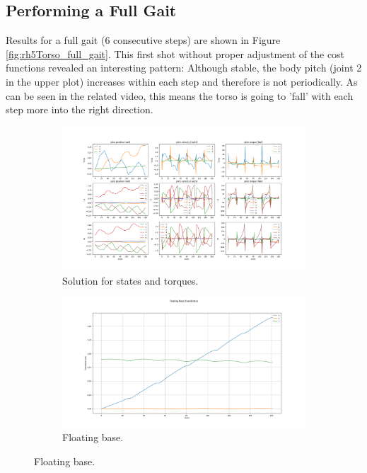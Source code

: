 \subsection{Performing a Full Gait}
Results for a full gait (6 consecutive steps) are shown in Figure \ref{fig:rh5Torso_full_gait}. This first shot without proper adjustment of the cost functions revealed an interesting pattern: Although stable, the body pitch (joint 2 in the upper plot) increases within each step and therefore is not periodically. As can be seen in the related video, this means the torso is going to 'fall' with each step more into the right direction. 
\begin{figure}[h!]
\begin{subfigure}{1\textwidth}
 	 \centering
	 \includegraphics[width=1\linewidth]{Media/Crocoddyl/RH5Torso/RH5TorsoGait_Solution.png}
 	 \caption{Solution for states and torques.}
\end{subfigure}
\begin{subfigure}{1\textwidth}
  	\centering
  	\includegraphics[width=1\linewidth]{Media/Crocoddyl/RH5Torso/RH5TorsoGait_BaseCoord.png}
  	\caption{Floating base.}
\end{subfigure}
\end{figure}
